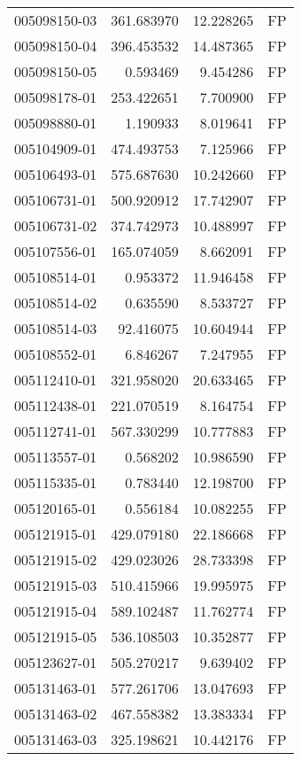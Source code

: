 \begin{tabular}{lrrl}
005098150-03 &  361.683970 &    12.228265 &   FP \\
005098150-04 &  396.453532 &    14.487365 &   FP \\
005098150-05 &    0.593469 &     9.454286 &   FP \\
005098178-01 &  253.422651 &     7.700900 &   FP \\
005098880-01 &    1.190933 &     8.019641 &   FP \\
005104909-01 &  474.493753 &     7.125966 &   FP \\
005106493-01 &  575.687630 &    10.242660 &   FP \\
005106731-01 &  500.920912 &    17.742907 &   FP \\
005106731-02 &  374.742973 &    10.488997 &   FP \\
005107556-01 &  165.074059 &     8.662091 &   FP \\
005108514-01 &    0.953372 &    11.946458 &   FP \\
005108514-02 &    0.635590 &     8.533727 &   FP \\
005108514-03 &   92.416075 &    10.604944 &   FP \\
005108552-01 &    6.846267 &     7.247955 &   FP \\
005112410-01 &  321.958020 &    20.633465 &   FP \\
005112438-01 &  221.070519 &     8.164754 &   FP \\
005112741-01 &  567.330299 &    10.777883 &   FP \\
005113557-01 &    0.568202 &    10.986590 &   FP \\
005115335-01 &    0.783440 &    12.198700 &   FP \\
005120165-01 &    0.556184 &    10.082255 &   FP \\
005121915-01 &  429.079180 &    22.186668 &   FP \\
005121915-02 &  429.023026 &    28.733398 &   FP \\
005121915-03 &  510.415966 &    19.995975 &   FP \\
005121915-04 &  589.102487 &    11.762774 &   FP \\
005121915-05 &  536.108503 &    10.352877 &   FP \\
005123627-01 &  505.270217 &     9.639402 &   FP \\
005131463-01 &  577.261706 &    13.047693 &   FP \\
005131463-02 &  467.558382 &    13.383334 &   FP \\
005131463-03 &  325.198621 &    10.442176 &   FP \\

\end{tabular}
